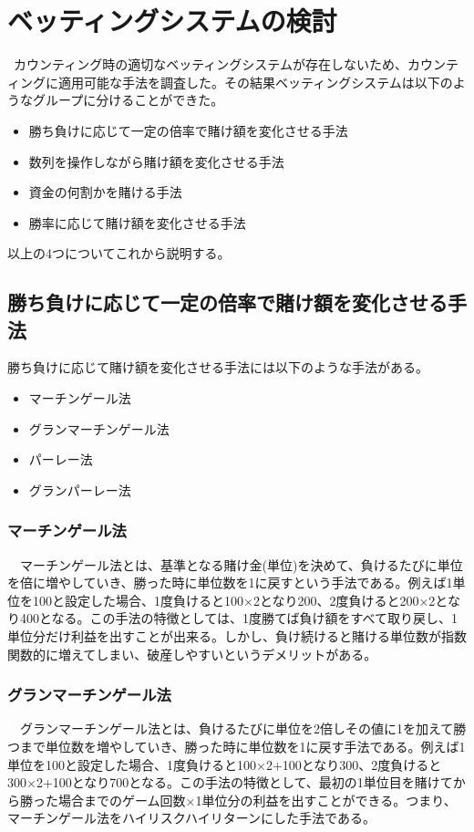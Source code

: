 \section{ベッティングシステムの検討}
\ カウンティング時の適切なベッティングシステムが存在しないため、カウンティングに適用可能な手法を調査した。その結果ベッティングシステムは以下のようなグループに分けることができた。
\begin{itemize}
\item 勝ち負けに応じて一定の倍率で賭け額を変化させる手法
\item 数列を操作しながら賭け額を変化させる手法
\item 資金の何割かを賭ける手法
\item 勝率に応じて賭け額を変化させる手法
\end{itemize}
以上の4つについてこれから説明する。

\subsection{勝ち負けに応じて一定の倍率で賭け額を変化させる手法}
勝ち負けに応じて賭け額を変化させる手法には以下のような手法がある。
 \begin{itemize}
 \item マーチンゲール法
 \item グランマーチンゲール法
 \item パーレー法
 \item グランパーレー法
 \end{itemize}
\subsubsection{マーチンゲール法}  
　マーチンゲール法とは、基準となる賭け金(単位)を決めて、負けるたびに単位を倍に増やしていき、勝った時に単位数を1に戻すという手法である。例えば1単位を100と設定した場合、1度負けると100×2となり200、2度負けると200×2となり400となる。この手法の特徴としては、1度勝てば負け額をすべて取り戻し、1単位分だけ利益を出すことが出来る。しかし、負け続けると賭ける単位数が指数関数的に増えてしまい、破産しやすいというデメリットがある。
\subsubsection{グランマーチンゲール法}  
　グランマーチンゲール法とは、負けるたびに単位を2倍しその値に1を加えて勝つまで単位数を増やしていき、勝った時に単位数を1に戻す手法である。例えば1単位を100と設定した場合、1度負けると100×2+100となり300、2度負けると300×2+100となり700となる。この手法の特徴として、最初の1単位目を賭けてから勝った場合までのゲーム回数×1単位分の利益を出すことができる。つまり、マーチンゲール法をハイリスクハイリターンにした手法である。
